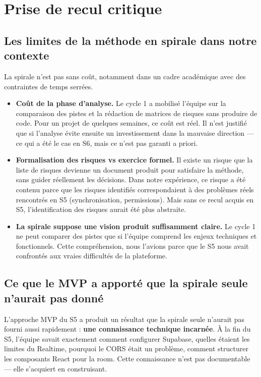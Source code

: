 \documentclass[11pt,a4paper]{report}
\begin{document}
\chapter{Prise de recul critique}

\section{Les limites de la méthode en spirale dans notre contexte}

La spirale n'est pas sans coût, notamment dans un cadre académique avec des contraintes de temps serrées.

\begin{itemize}
    \item \textbf{Coût de la phase d'analyse.} Le cycle 1 a mobilisé l'équipe sur la comparaison des pistes et la rédaction de matrices de risques sans produire de code. Pour un projet de quelques semaines, ce coût est réel. Il n'est justifié que si l'analyse évite ensuite un investissement dans la mauvaise direction --- ce qui a été le cas en S6, mais ce n'est pas garanti a priori.
    \item \textbf{Formalisation des risques vs exercice formel.} Il existe un risque que la liste de risques devienne un document produit pour satisfaire la méthode, sans guider réellement les décisions. Dans notre expérience, ce risque a été contenu parce que les risques identifiés correspondaient à des problèmes réels rencontrés en S5 (synchronisation, permissions). Mais sans ce recul acquis en S5, l'identification des risques aurait été plus abstraite.
    \item \textbf{La spirale suppose une vision produit suffisamment claire.} Le cycle 1 ne peut comparer des pistes que si l'équipe comprend les enjeux techniques et fonctionnels. Cette compréhension, nous l'avions parce que le S5 nous avait confrontés aux vraies difficultés de la plateforme.
\end{itemize}

\section{Ce que le MVP a apporté que la spirale seule n'aurait pas donné}

L'approche MVP du S5 a produit un résultat que la spirale seule n'aurait pas fourni aussi rapidement : \textbf{une connaissance technique incarnée}. À la fin du S5, l'équipe savait exactement comment configurer Supabase, quelles étaient les limites du Realtime, pourquoi le CORS était un problème, comment structurer les composants React pour la room. Cette connaissance n'est pas documentable --- elle s'acquiert en construisant.
\end{document}
